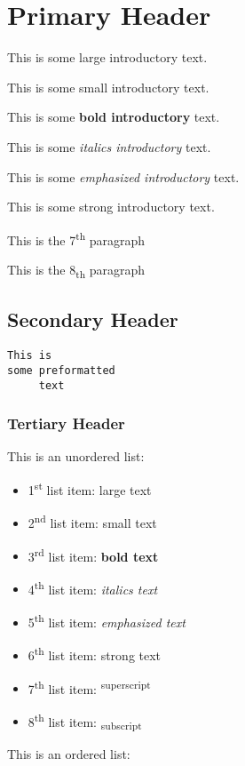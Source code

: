 \documentclass[12pt]{article}
\begin{document}
\section{Primary Header}This is some {\Large large introductory} text.

This is some {\scriptsize small introductory} text.

This is some \textbf{bold introductory} text.

This is some \textit{italics introductory} text.

This is some \emph{emphasized introductory} text.

This is some \textmd{strong introductory} text.

This is the 7\textsuperscript{th} paragraph

This is the 8\textsubscript{th} paragraph

\subsection{Secondary Header}\begin{verbatim}This is
some preformatted
     text\end{verbatim}
\subsubsection{Tertiary Header}This is an unordered list:

\begin{itemize}
    \item 1\textsuperscript{st} list item: {\Large large text}

    \item 2\textsuperscript{nd} list item: {\scriptsize small text}

    \item 3\textsuperscript{rd} list item: \textbf{bold text}

    \item 4\textsuperscript{th} list item: \textit{italics text}

    \item 5\textsuperscript{th} list item: \emph{emphasized text}

    \item 6\textsuperscript{th} list item: \textmd{strong text}

    \item 7\textsuperscript{th} list item: \textsuperscript{superscript}

    \item 8\textsuperscript{th} list item: \textsubscript{subscript}

\end{itemize}
This is an ordered list:
\end{document}
